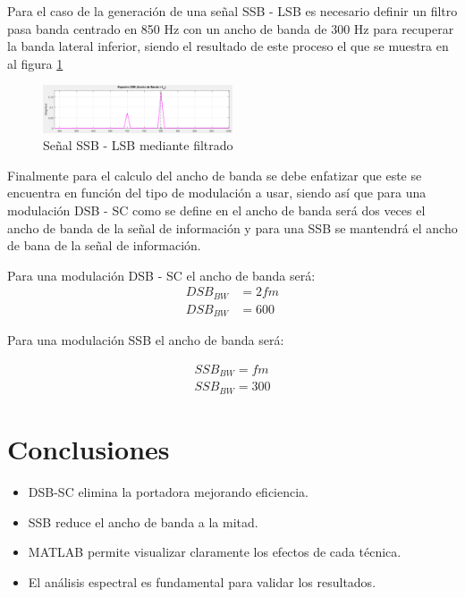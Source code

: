 \documentclass[conference]{IEEEtran}
\begin{document}
	Para el caso de la generación de una señal SSB - LSB es necesario definir un filtro pasa banda centrado en 850 Hz con un ancho de banda de 300 Hz para recuperar la banda lateral inferior, siendo el resultado de este proceso el que se muestra en al figura \ref{fig:ssb-ejercicio}
	
	\begin{figure}[h]
		\centering
		\includegraphics[width=0.5\textwidth]{media/ssb-ejercicio}
		\caption{Señal SSB - LSB mediante filtrado}
		\label{fig:ssb-ejercicio}
	\end{figure}
	
	Finalmente para el calculo del ancho de banda se debe enfatizar que este se encuentra en función del tipo de modulación a usar, siendo así que para una modulación DSB - SC como se define en \cite{tomasi2004sistemas} el ancho de banda será dos veces el ancho de banda de la señal de información y para una SSB se mantendrá el ancho de bana de la señal de información.
	
	Para una modulación DSB - SC el ancho de banda será:
	\begin{align*}
		DSB_{BW} &= 2fm \\
		DSB_{BW} &= 600
	\end{align*}
	
	Para una modulación SSB el ancho de banda será:
	
	\begin{align*}
		SSB_{BW} = fm \\
		SSB_{BW} = 300
	\end{align*}
	
	\section{Conclusiones}
	
	\begin{itemize}
		\item DSB-SC elimina la portadora mejorando eficiencia.
		\item SSB reduce el ancho de banda a la mitad.
		\item MATLAB permite visualizar claramente los efectos de cada técnica.
		\item El análisis espectral es fundamental para validar los resultados.
	\end{itemize}
	
	
	
\end{document}
